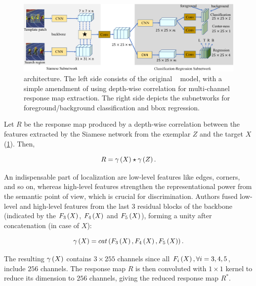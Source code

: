 \begin{figure}[t]
    \centerline{\includegraphics[width=\linewidth]{figures/theoretical_foundations/siamcar_architecture.pdf}}
    \caption[ architecture]{ architecture. The left side consists of the original ~\cite{Bertinetto2016} model, with a simple amendment of using depth-wise correlation for multi-channel response map extraction. The right side depicts the subnetworks for foreground/background classification and \gls{bbox} regression. }
    \label{fig:SiamCARArchitecture}
\end{figure}

Let $R$ be the response map produced by a depth-wise correlation between the features extracted by the Siamese network from the exemplar $Z$ and the target $X$ (\cref{fig:SiamCARArchitecture}). Then,

\begin{equation}
    R = {\gamma} \left( X \right) \star {\gamma} \left( Z \right).
\end{equation}

\noindent An indispensable part of localization are low-level features like edges, corners, and so on, whereas high-level features strengthen the representational power from the semantic point of view, which is crucial for discrimination. Authors fused low-level and high-level features from the last $3$ residual blocks of the  backbone (indicated by the ${F_3} \left( X \right)$, ${F_4} \left( X \right)$ and ${F_5} \left( X \right)$), forming a unity after concatenation (in case of $X$):

\begin{equation}
    {\gamma} \left( X \right) = {cat} \left( {F_3} \left( X \right), {F_4} \left( X \right), {F_5} \left( X \right) \right).
\end{equation}

\noindent The resulting ${\gamma} \left( X \right)$ contains $3 \times 255$ channels since all ${F_i} \left( X \right), \forall i = 3, 4, 5$, include $256$ channels. The response map $R$ is then convoluted with $1 \times 1$ kernel to reduce its dimension to $256$ channels, giving the reduced response map $R^*$.

